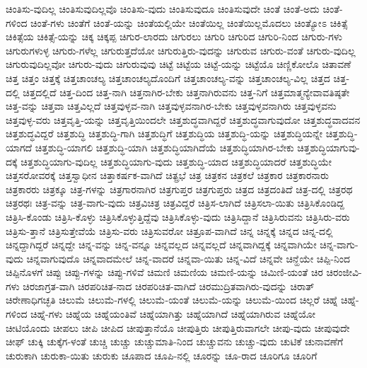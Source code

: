 {ಚಿಂತಿಸು-ವುದಿಲ್ಲ
ಚಿಂತಿಸುವುದಿಲ್ಲವೊ
ಚಿಂತಿಸು-ವುದು
ಚಿಂತಿಸುವುದೂ
ಚಿಂತಿಸುವುದೇ
ಚಿಂತೆ
ಚಿಂತೆ-ಅದು
ಚಿಂತೆ-ಗಳಿಂದ
ಚಿಂತೆ-ಗಳು
ಚಿಂತೆಗೆ
ಚಿಂತೆ-ಯನ್ನು
ಚಿಂತೆಯಲ್ಲಿಯೇ
ಚಿಂತೆಯಿಲ್ಲ
ಚಿಂತೆಯಿಲ್ಲಮೊದಲು
ಚಿಂತ್ಯೋಽ
ಚಿಕಿತ್ಸೆ
ಚಿಕಿತ್ಸೆಯ
ಚಿಕಿತ್ಸೆ-ಯನ್ನು
ಚಿಕ್ಕ
ಚಿಕ್ಕಪ್ಪ
ಚಿಗುರ-ಲಾರದು
ಚಿಗುರಲು
ಚಿಗುರಿ
ಚಿಗುರಿದ
ಚಿಗುರಿ-ನಿಂದ
ಚಿಗುರು-ಗಳು
ಚಿಗುರುಗಳುಳ್ಳ
ಚಿಗುರು-ಗಳೆಲ್ಲ
ಚಿಗುರುತ್ತದೆಯೋ
ಚಿಗುರುತ್ತಿರು-ವುದನ್ನು
ಚಿಗುರುವ
ಚಿಗುರು-ವಂತೆ
ಚಿಗುರು-ವುದಿಲ್ಲ
ಚಿಗುರುವುದಿಲ್ಲವೋ
ಚಿಗುರು-ವುದು
ಚಿಗುರುವುವು
ಚಿಟ್ಟೆ
ಚಿಟ್ಟೆಯ
ಚಿಟ್ಟೆ-ಯನ್ನು
ಚಿಟ್ಟೆಯೊ
ಚಿಣ್ಣಿಕೋಲೊ
ಚಿತಾವಣೆ
ಚಿತ್ತ
ಚಿತ್ತಂ
ಚಿತ್ತಕ್ಕೆ
ಚಿತ್ತಚಾಂಚಲ್ಯ
ಚಿತ್ತಚಾಂಚಲ್ಯದೊಂದಿಗೆ
ಚಿತ್ತಚಾಂಚಲ್ಯ-ವನ್ನು
ಚಿತ್ತಚಾಂಚಲ್ಯ-ವಿಲ್ಲ
ಚಿತ್ತದ
ಚಿತ್ತ-ದಲ್ಲಿ
ಚಿತ್ತದಲ್ಲಿದೆ
ಚಿತ್ತ-ದಿಂದ
ಚಿತ್ತ-ನಾಗಿ
ಚಿತ್ತನಾಗಿರ-ಬೇಕು
ಚಿತ್ತನಾಗಿರುವನು
ಚಿತ್ತ-ನಿಗೆ
ಚಿತ್ತಮಾತ್ಮನ್ಯೇವಾವತಿಷ್ಠತೇ
ಚಿತ್ತ-ವನ್ನು
ಚಿತ್ತವಾ
ಚಿತ್ತವಿಲ್ಲದೆ
ಚಿತ್ತವುಳ್ಳವ-ನಾಗಿ
ಚಿತ್ತವುಳ್ಳವನಾಗಿರ-ಬೇಕು
ಚಿತ್ತವುಳ್ಳವನಾಗಿರು
ಚಿತ್ತವುಳ್ಳವನು
ಚಿತ್ತವುಳ್ಳ-ವರು
ಚಿತ್ತವೃತ್ತಿ-ಯನ್ನು
ಚಿತ್ತವೃತ್ತಿಯಿಂದಲೇ
ಚಿತ್ತಶುದ್ಧವಾಗಿದ್ದರೆ
ಚಿತ್ತಶುದ್ಧವಾಗುವುದೋ
ಚಿತ್ತಶುದ್ಧವಾದವನ
ಚಿತ್ತಶುದ್ಧವಿದ್ದರೆ
ಚಿತ್ತಶುದ್ಧಿ
ಚಿತ್ತಶುದ್ಧಿ-ಗಾಗಿ
ಚಿತ್ತಶುದ್ಧಿಗೆ
ಚಿತ್ತಶುದ್ಧಿಯ
ಚಿತ್ತಶುದ್ಧಿ-ಯನ್ನು
ಚಿತ್ತಶುದ್ಧಿಯನ್ನೇ
ಚಿತ್ತಶುದ್ಧಿ-ಯಾಗದೆ
ಚಿತ್ತಶುದ್ಧಿ-ಯಾಗಲಿ
ಚಿತ್ತಶುದ್ಧಿ-ಯಾಗಿ
ಚಿತ್ತಶುದ್ಧಿಯಾಗಿದೆಯೆ
ಚಿತ್ತಶುದ್ಧಿಯಾಗಿರ-ಬೇಕು
ಚಿತ್ತಶುದ್ಧಿಯಾಗುವು-ದಕ್ಕೆ
ಚಿತ್ತಶುದ್ಧಿಯಾಗು-ವುದಿಲ್ಲ
ಚಿತ್ತಶುದ್ಧಿಯಾಗು-ವುದು
ಚಿತ್ತಶುದ್ಧಿ-ಯಾದ
ಚಿತ್ತಶುದ್ಧಿಯಾದರೆ
ಚಿತ್ತಶುದ್ಧಿಯೇ
ಚಿತ್ತಸರೋವರಕ್ಕೆ
ಚಿತ್ತಸ್ವಾಧೀನ
ಚಿತ್ತಾಕರ್ಷಕ-ವಾಗಿದೆ
ಚಿತ್ಪ್ರಭೆ
ಚಿತ್ರ
ಚಿತ್ರಕನ
ಚಿತ್ರಕಲೆ
ಚಿತ್ರಕಾರ
ಚಿತ್ರಕಾರನಾರು
ಚಿತ್ರಕಾರರು
ಚಿತ್ರಕ್ಕೂ
ಚಿತ್ರ-ಗಳನ್ನು
ಚಿತ್ರಗಾರನಾಗಿರ
ಚಿತ್ರಗುಪ್ತರ
ಚಿತ್ರಗುಪ್ತರು
ಚಿತ್ರದ
ಚಿತ್ರದಂತಿದೆ
ಚಿತ್ರ-ದಲ್ಲಿ
ಚಿತ್ರರಥ
ಚಿತ್ರರಥಃ
ಚಿತ್ರ-ವನ್ನು
ಚಿತ್ರ-ವಾಗು-ವುದು
ಚಿತ್ರವಿಚಿತ್ರ
ಚಿತ್ರವಿದ್ದರೆ
ಚಿತ್ರಿಸ-ಲಾಗಿದೆ
ಚಿತ್ರಿಸಲಾ-ಯಿತು
ಚಿತ್ರಿಸಿಕೊಂಡಿದ್ದ
ಚಿತ್ರಿಸಿ-ಕೊಂಡು
ಚಿತ್ರಿಸಿ-ಕೊಳ್ಳು
ಚಿತ್ರಿಸಿಕೊಳ್ಳುತ್ತಿದ್ದೆವು
ಚಿತ್ರಿಸಿಕೊಳ್ಳು-ವುದು
ಚಿತ್ರಿಸಿದ್ದಾನೆ
ಚಿತ್ರಿಸಿರುವನು
ಚಿತ್ರಿಸಿರು-ವರು
ಚಿತ್ರಿಸು-ತ್ತಾನೆ
ಚಿತ್ರಿಸುತ್ತೇವೆಯೆ
ಚಿತ್ರಿಸು-ವರು
ಚಿತ್ರಿಸುವರೋ
ಚಿತ್ರೂಪ-ವಾಗಿದೆ
ಚಿನ್ನ
ಚಿನ್ನಕ್ಕೆ
ಚಿನ್ನದ
ಚಿನ್ನ-ದಲ್ಲಿ
ಚಿನ್ನದ್ದಾಗಿದ್ದರೆ
ಚಿನ್ನದ್ದೇ
ಚಿನ್ನ-ವನ್ನು
ಚಿನ್ನ-ವನ್ನೂ
ಚಿನ್ನವಲ್ಲದ
ಚಿನ್ನವಲ್ಲದೆ
ಚಿನ್ನವಾಗಿದ್ದಕ್ಕೆ
ಚಿನ್ನವಾಗಿಯೇ
ಚಿನ್ನ-ವಾಗು-ವುದು
ಚಿನ್ನವಾಗುವುದೊ
ಚಿನ್ನವಾದಮೇಲೆ
ಚಿನ್ನ-ವಾದರೆ
ಚಿನ್ನವಾ-ಯಿತು
ಚಿನ್ನ-ವಿದೆ
ಚಿನ್ನವೇ
ಚಿನ್ಹೆಯೇ
ಚಿಪ್ಪಿ-ನಿಂದ
ಚಿಪ್ಪಿನೊಳಗೆ
ಚಿಪ್ಪು
ಚಿಪ್ಪು-ಗಳನ್ನು
ಚಿಪ್ಪು-ಗಳಿವೆ
ಚಿಮಣಿ
ಚಿಮಣಿಯ
ಚಿಮಣಿ-ಯನ್ನು
ಚಿಮಿಣಿ-ಯಂತೆ
ಚಿರ
ಚಿರಂಜೀವಿ-ಗಳು
ಚಿರಜಾಗ್ರತ-ವಾಗಿ
ಚಿರಪರಿಚಿತ-ನಾದ
ಚಿರಪರಿಚಿತ-ವಾಗಿದೆ
ಚಿರಮುದ್ರಿತವಾಗಿರು-ವುದನ್ನು
ಚಿರಾತ್
ಚಿರೇಣಾಧಿಗಚ್ಛತಿ
ಚಿಲುಮೆ
ಚಿಲುಮೆ-ಗಳಲ್ಲಿ
ಚಿಲುಮೆ-ಯಂತೆ
ಚಿಲುಮೆ-ಯನ್ನು
ಚಿಲುಮೆ-ಯಿಂದ
ಚಿಲ್ಲರೆ
ಚಿಹ್ನೆ
ಚಿಹ್ನೆ-ಗಳಿಂದ
ಚಿಹ್ನೆ-ಗಳು
ಚಿಹ್ನೆಯ
ಚಿಹ್ನೆಯಂತಿವೆ
ಚಿಹ್ನೆಯಾಗಿತ್ತು
ಚಿಹ್ನೆಯಾಗಿದೆ
ಚಿಹ್ನೆಯಾಗಿರುವ
ಚಿಹ್ನೆಯೋ
ಚೀಟಿಯೊಂದು
ಚೀಪಲು
ಚೀಪಿ
ಚೀಪಿದ
ಚೀಪುತ್ತಾನೆಯೊ
ಚೀಪುತ್ತಿರು
ಚೀಪುತ್ತಿರುವಾಗಲೇ
ಚೀಪು-ವುದು
ಚೀಪುವುದೇ
ಚೀಫ್
ಚುಕ್ಕಿ
ಚುಕ್ಕೆಗ-ಳಂತೆ
ಚುಚ್ಚಿ
ಚುಚ್ಚು
ಚುಚ್ಚುಮಾತಿ-ನಿಂದ
ಚುಚ್ಚುವನು
ಚುಚ್ಚು-ವುದು
ಚುಟಿಕೆ
ಚುನಾವಣೆಗೆ
ಚುರುಕಾಗಿ
ಚುರುಕಾ-ಯಿತು
ಚುರುಕು
ಚೂಪಾದ
ಚೂಪಿ-ನಲ್ಲಿ
ಚೂರನ್ನು
ಚೂ-ರಾದ
ಚೂರಿಗೂ
ಚೂರಿಗೆ
}
